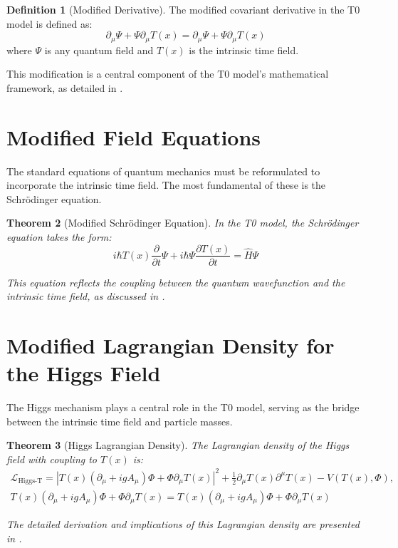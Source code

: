 \documentclass[12pt,a4paper]{article}
\newcommand{\Tfield}{T(x)}
\newcommand{\DcovT}[1]{\partial_\mu #1 + #1 \partial_\mu \Tfield}
\newcommand{\DhiggsT}{\Tfield (\partial_\mu + ig A_\mu) \Phi + \Phi \partial_\mu \Tfield}
\newtheorem{theorem}{Theorem}[section]
\theoremstyle{definition}
\newtheorem{definition}[theorem]{Definition}
\theoremstyle{remark}
\begin{document}
	\begin{definition}[Modified Derivative]
		The modified covariant derivative in the T0 model is defined as:
		\begin{equation}
			\DcovT{\Psi} = \partial_\mu \Psi + \Psi \partial_\mu \Tfield
		\end{equation}
		where \(\Psi\) is any quantum field and \(\Tfield\) is the intrinsic time field.
		
		This modification is a central component of the T0 model's mathematical framework, as detailed in \cite{pascher_feldtheorie_2025}.
	\end{definition}
	
	\section{Modified Field Equations}
	The standard equations of quantum mechanics must be reformulated to incorporate the intrinsic time field. The most fundamental of these is the Schrödinger equation.
	
	\begin{theorem}[Modified Schrödinger Equation]
		In the T0 model, the Schrödinger equation takes the form:
		\begin{equation}
			i\hbar \Tfield \frac{\partial}{\partial t} \Psi + i\hbar \Psi \frac{\partial \Tfield}{\partial t} = \hat{H} \Psi
		\end{equation}
		
		This equation reflects the coupling between the quantum wavefunction and the intrinsic time field, as discussed in \cite{pascher_zeit_2025}.
	\end{theorem}
	
	\section{Modified Lagrangian Density for the Higgs Field}
	The Higgs mechanism plays a central role in the T0 model, serving as the bridge between the intrinsic time field and particle masses.
	
	\begin{theorem}[Higgs Lagrangian Density]
		The Lagrangian density of the Higgs field with coupling to \(\Tfield\) is:
		\begin{multline}
			\mathcal{L}_{\text{Higgs-T}} = |\DhiggsT|^2 + \frac{1}{2} \partial_\mu \Tfield \partial^\mu \Tfield - V(\Tfield, \Phi), \quad \\
			\DhiggsT = \Tfield (\partial_\mu + ig A_\mu) \Phi + \Phi \partial_\mu \Tfield
		\end{multline}
		
		The detailed derivation and implications of this Lagrangian density are presented in \cite{pascher_higgs_2025}.
	\end{theorem}
	
\end{document}

